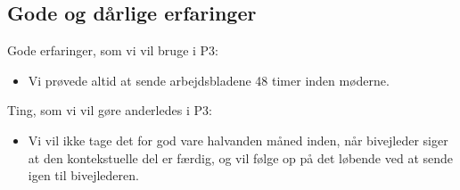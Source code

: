 \subsection{Gode og d\aa{}rlige erfaringer}
Gode erfaringer, som vi vil bruge i P3:
\begin{itemize}
\item Vi pr\o{}vede altid at sende arbejdsbladene 48 timer inden m\o{}derne.
\end{itemize}
Ting, som vi vil g\o{}re anderledes i P3:
\begin{itemize}
\item Vi vil ikke tage det for god vare halvanden m\aa{}ned inden, n\aa{}r bivejleder siger at den kontekstuelle del er f\ae{}rdig, og vil f\o{}lge op p\aa{} det l\o{}bende ved at sende igen til bivejlederen.
\end{itemize}